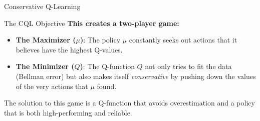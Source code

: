 \documentclass[11pt]{beamer}
\begin{document}
\begin{frame}{Conservative Q-Learning}
\begin{block}{The CQL Objective}
        \textbf{This creates a two-player game:}
        \begin{itemize}
            \item \textbf{The Maximizer ($\mu$)}: The policy $\mu$ constantly seeks out actions that it believes have the highest Q-values.
            \item \textbf{The Minimizer ($Q$)}: The Q-function $Q$ not only tries to fit the data (Bellman error) but also makes itself \textit{conservative} by pushing down the values of the very actions that $\mu$ found.
        \end{itemize}
        The solution to this game is a Q-function that avoids overestimation and a policy that is both high-performing and reliable.
    \end{block}
\end{frame}


    
    

    
\end{document}
